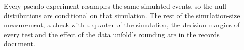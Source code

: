 Every pseudo-experiment resamples the same simulated events, so the null distributions are conditional on that simulation. The rest of the simulation-size measurement, a check with a quarter of the simulation, the decision margins of every test and the effect of the data unfold's rounding are in the records document.

